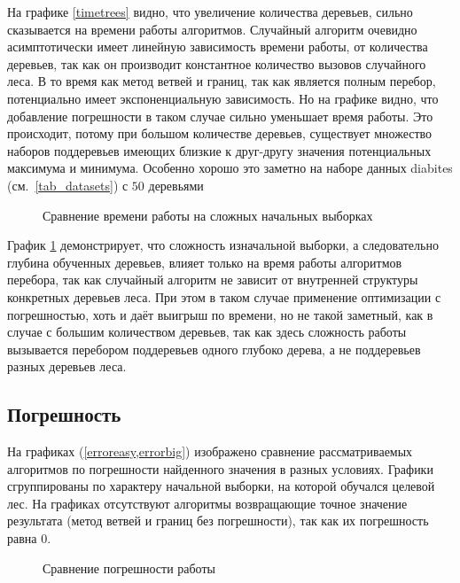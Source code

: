 На графике \cref{timetrees} видно, что увеличение количества деревьев, сильно
сказывается на времени работы алгоритмов. Случайный алгоритм очевидно
асимптотически имеет линейную зависимость времени работы, от количества
деревьев, так как он производит константное количество вызовов случайного леса.
В то время как метод ветвей и границ, так как является полным перебор,
потенциально имеет экспоненциальную зависимость. Но на графике видно, что
добавление погрешности в таком случае сильно уменьшает время работы. Это
происходит, потому при большом количестве деревьев, существует множество наборов
поддеревьев имеющих близкие к друг-другу значения потенциальных максимума
и минимума. Особенно хорошо это заметно на наборе данных diabites
(см.~\cref{tab_datasets}) с $50$ деревьями

\begin{figure}[H]
    \caption{Сравнение времени работы на сложных начальных выборках}\label{timebig}
\end{figure}

График \cref{timebig} демонстрирует, что сложность изначальной выборки,
а следовательно глубина обученных деревьев, влияет только на время работы
алгоритмов перебора, так как случайный алгоритм не зависит от внутренней
структуры конкретных деревьев леса. При этом в таком случае применение
оптимизации с погрешностью, хоть и даёт выигрыш по времени, но не такой
заметный, как в случае с большим количеством деревьев, так как здесь сложность
работы вызывается перебором поддеревьев одного глубоко дерева, а не поддеревьев
разных деревьев леса.

\subsection{Погрешность}\label{sec:error}

На графиках (\cref{erroreasy,errorbig}) изображено сравнение рассматриваемых
алгоритмов по погрешности найденного значения в разных условиях. Графики
сгруппированы по характеру начальной выборки, на которой обучался целевой лес.
На графиках отсутствуют алгоритмы возвращающие точное значение результата (метод
ветвей и границ без погрешности), так как их погрешность равна $0$.

\begin{figure}[H]
    \caption{Сравнение погрешности работы}\label{erroreasy}
\end{figure}

